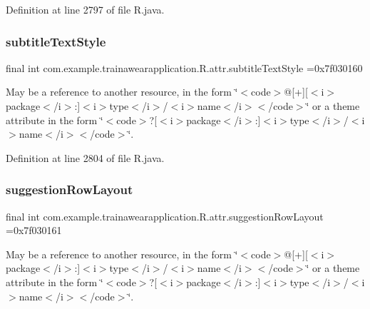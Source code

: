Definition at line 2797 of file R.\+java.

\mbox{\label{classcom_1_1example_1_1trainawearapplication_1_1_r_1_1attr_a84589b06b3370917f4e1ff16956ace2b}} 
\subsubsection{\texorpdfstring{subtitleTextStyle}{subtitleTextStyle}}
{\footnotesize\ttfamily final int com.\+example.\+trainawearapplication.\+R.\+attr.\+subtitle\+Text\+Style =0x7f030160\hspace{0.3cm}{\ttfamily [static]}}

May be a reference to another resource, in the form \char`\"{}$<$code$>$@\mbox{[}+\mbox{]}\mbox{[}$<$i$>$package$<$/i$>$\+:\mbox{]}$<$i$>$type$<$/i$>$/$<$i$>$name$<$/i$>$$<$/code$>$\char`\"{} or a theme attribute in the form \char`\"{}$<$code$>$?\mbox{[}$<$i$>$package$<$/i$>$\+:\mbox{]}$<$i$>$type$<$/i$>$/$<$i$>$name$<$/i$>$$<$/code$>$\char`\"{}. 

Definition at line 2804 of file R.\+java.

\mbox{\label{classcom_1_1example_1_1trainawearapplication_1_1_r_1_1attr_a6dfcfc2d7f1cfb70885927ff8c0d032e}} 
\subsubsection{\texorpdfstring{suggestionRowLayout}{suggestionRowLayout}}
{\footnotesize\ttfamily final int com.\+example.\+trainawearapplication.\+R.\+attr.\+suggestion\+Row\+Layout =0x7f030161\hspace{0.3cm}{\ttfamily [static]}}

May be a reference to another resource, in the form \char`\"{}$<$code$>$@\mbox{[}+\mbox{]}\mbox{[}$<$i$>$package$<$/i$>$\+:\mbox{]}$<$i$>$type$<$/i$>$/$<$i$>$name$<$/i$>$$<$/code$>$\char`\"{} or a theme attribute in the form \char`\"{}$<$code$>$?\mbox{[}$<$i$>$package$<$/i$>$\+:\mbox{]}$<$i$>$type$<$/i$>$/$<$i$>$name$<$/i$>$$<$/code$>$\char`\"{}. 

